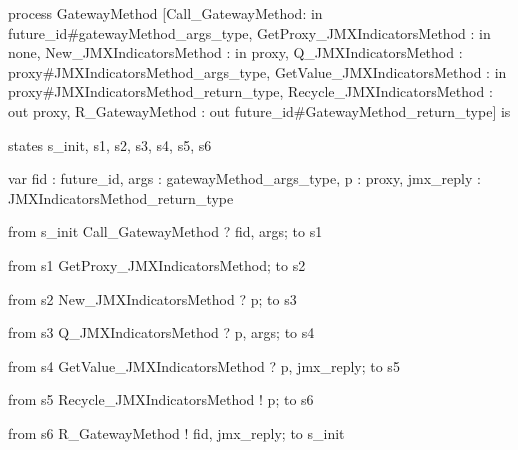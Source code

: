 process GatewayMethod [Call_GatewayMethod: in                  future_id#gatewayMethod_args_type,
 GetProxy_JMXIndicatorsMethod  : in none,
 New_JMXIndicatorsMethod       : in proxy,
 Q_JMXIndicatorsMethod         :  proxy#JMXIndicatorsMethod_args_type,
 GetValue_JMXIndicatorsMethod  : in proxy#JMXIndicatorsMethod_return_type, 
 Recycle_JMXIndicatorsMethod   : out proxy,
 R_GatewayMethod               : out future_id#GatewayMethod_return_type] is

	states s_init, s1, s2, s3, s4, s5, s6
	
	var fid       : future_id,
	    args      : gatewayMethod_args_type,
		p         : proxy,
		jmx_reply : JMXIndicatorsMethod_return_type
	
	from s_init
		Call_GatewayMethod ? fid, args;
		to s1
	
	from s1
		GetProxy_JMXIndicatorsMethod;
		to s2
	
	from s2
		New_JMXIndicatorsMethod ? p; 
		to s3
			
	from s3
		Q_JMXIndicatorsMethod ? p, args;
		to s4
		
	from s4
		GetValue_JMXIndicatorsMethod ? p, jmx_reply;
		to s5
		
	from s5
		Recycle_JMXIndicatorsMethod ! p;
		to s6
	
	from s6	
		R_GatewayMethod ! fid, jmx_reply;
		to s_init